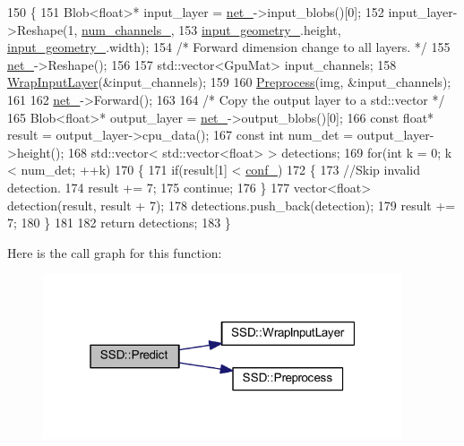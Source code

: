 \begin{DoxyCode}
150 \{
151     Blob<float>* input\_layer = \mbox{\hyperlink{class_s_s_d_a9b70501b85252c3135030e5c6c1e7117}{net\_}}->input\_blobs()[0];
152     input\_layer->Reshape(1, \mbox{\hyperlink{class_s_s_d_affe6f7e948b0040bd958db34758d8ab1}{num\_channels\_}},
153                          \mbox{\hyperlink{class_s_s_d_a3fe828551a5a53a3f43a481ae5d2d96a}{input\_geometry\_}}.height, \mbox{\hyperlink{class_s_s_d_a3fe828551a5a53a3f43a481ae5d2d96a}{input\_geometry\_}}.width);
154     \textcolor{comment}{/* Forward dimension change to all layers. */}
155     \mbox{\hyperlink{class_s_s_d_a9b70501b85252c3135030e5c6c1e7117}{net\_}}->Reshape();
156 
157     std::vector<GpuMat> input\_channels;
158     \mbox{\hyperlink{class_s_s_d_aec550d5312257216d93955cdee13a73e}{WrapInputLayer}}(&input\_channels);
159 
160     \mbox{\hyperlink{class_s_s_d_a83cb8c64cda9b3792c5612613b56c828}{Preprocess}}(img, &input\_channels);
161 
162     \mbox{\hyperlink{class_s_s_d_a9b70501b85252c3135030e5c6c1e7117}{net\_}}->Forward();
163 
164     \textcolor{comment}{/* Copy the output layer to a std::vector */}
165     Blob<float>* output\_layer = \mbox{\hyperlink{class_s_s_d_a9b70501b85252c3135030e5c6c1e7117}{net\_}}->output\_blobs()[0];
166     \textcolor{keyword}{const} \textcolor{keywordtype}{float}* result = output\_layer->cpu\_data();
167     \textcolor{keyword}{const} \textcolor{keywordtype}{int} num\_det = output\_layer->height();
168     std::vector< std::vector<float> > detections;
169     \textcolor{keywordflow}{for}(\textcolor{keywordtype}{int} k = 0; k < num\_det; ++k)
170     \{
171         \textcolor{keywordflow}{if}(result[1] < \mbox{\hyperlink{class_s_s_d_a2deab37585140ff74fbec6e54f5407bf}{conf\_}})
172         \{
173             \textcolor{comment}{//Skip invalid detection.}
174             result += 7;
175             \textcolor{keywordflow}{continue};
176         \}
177         vector<float> detection(result, result + 7);
178         detections.push\_back(detection);
179         result += 7;
180     \}
181 
182     \textcolor{keywordflow}{return} detections;
183 \}
\end{DoxyCode}
Here is the call graph for this function\+:\nopagebreak
\begin{figure}[H]
\begin{center}
\leavevmode
\includegraphics[width=301pt]{class_s_s_d_a58c0ef81b4b24424fd967d90da5c6045_cgraph}
\end{center}
\end{figure}
